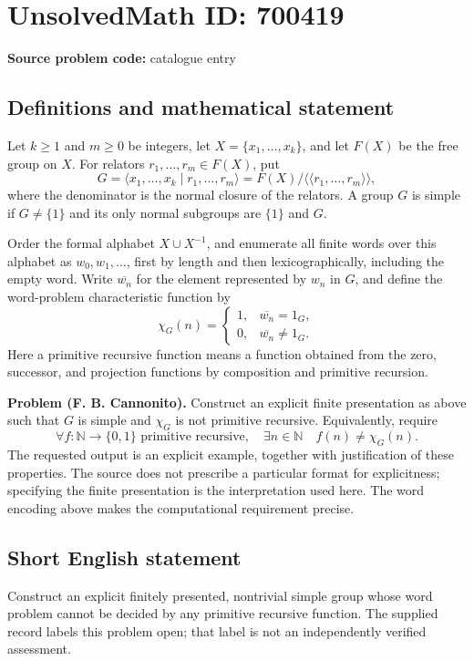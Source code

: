 \documentclass[11pt]{article}
\begin{document}
\section*{UnsolvedMath ID: 700419}
\textbf{Source problem code:} catalogue entry
\subsection{Definitions and mathematical statement}
Let \(k\geq 1\) and \(m\geq 0\) be integers, let \(X=\{x_1,\ldots,x_k\}\), and let \(F(X)\) be the free group on \(X\). For relators \(r_1,\ldots,r_m\in F(X)\), put
\[
G=\langle x_1,\ldots,x_k\mid r_1,\ldots,r_m\rangle
 =F(X)/\langle\!\langle r_1,\ldots,r_m\rangle\!\rangle,
\]
where the denominator is the normal closure of the relators. A group \(G\) is simple if \(G\neq\{1\}\) and its only normal subgroups are \(\{1\}\) and \(G\).

Order the formal alphabet \(X\cup X^{-1}\), and enumerate all finite words over this alphabet as \(w_0,w_1,\ldots\), first by length and then lexicographically, including the empty word. Write \(\overline{w_n}\) for the element represented by \(w_n\) in \(G\), and define the word-problem characteristic function by
\[
\chi_G(n)=
\begin{cases}
1,&\overline{w_n}=1_G,\\
0,&\overline{w_n}\neq 1_G.
\end{cases}
\]
Here a primitive recursive function means a function obtained from the zero, successor, and projection functions by composition and primitive recursion.

\textbf{Problem (F. B. Cannonito).} Construct an explicit finite presentation as above such that \(G\) is simple and \(\chi_G\) is not primitive recursive. Equivalently, require
\[
\forall f:\mathbb{N}\to\{0,1\}\text{ primitive recursive},\quad
\exists n\in\mathbb{N}\quad f(n)\neq\chi_G(n).
\]
The requested output is an explicit example, together with justification of these properties. The source does not prescribe a particular format for explicitness; specifying the finite presentation is the interpretation used here. The word encoding above makes the computational requirement precise.
\subsection{Short English statement}
Construct an explicit finitely presented, nontrivial simple group whose word problem cannot be decided by any primitive recursive function. The supplied record labels this problem open; that label is not an independently verified assessment.
\end{document}
